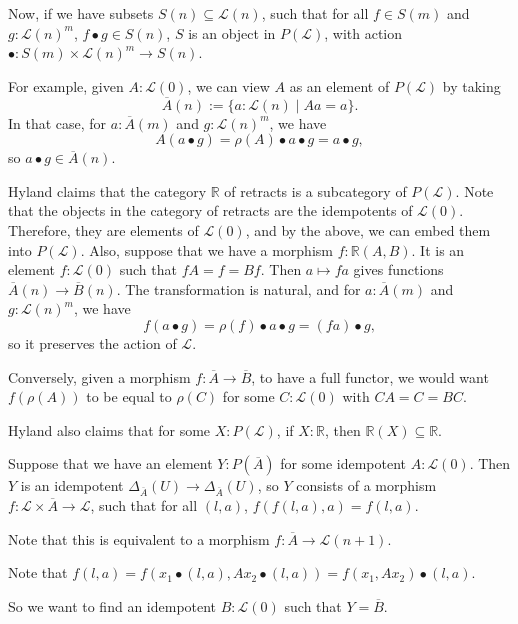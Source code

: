 \documentclass{amsbook}
\newcommand{\Hom}[3]{{#1}\left(#2,#3\right)}
\theoremstyle{definition}
\begin{document}
  Now, if we have subsets $ S(n) \subseteq \mathcal L(n) $, such that for all $ f \in S(m) $ and $ g: \mathcal L(n)^m $, $ f \bullet g \in S(n) $, $ S $ is an object in $ P(\mathcal L) $, with action $ \bullet: S(m) \times \mathcal L(n)^m \to S(n) $.

  For example, given $ A: \mathcal L(0) $, we can view $ A $ as an element of $ P(\mathcal L) $ by taking
  \[ \overline A(n) := \{ a: \mathcal L(n) \mid A a = a \}. \]
  In that case, for $ a: \overline A(m) $ and $ g: \mathcal L(n)^m $, we have
  \[ A (a \bullet g)
    = \rho(A) \bullet a \bullet g
    = a \bullet g, \]
  so $ a \bullet g \in \overline A(n) $.

  Hyland claims that the category $ \mathbb R $ of retracts is a subcategory of $ P(\mathcal L) $. Note that the objects in the category of retracts are the idempotents of $ \mathcal L(0) $. Therefore, they are elements of $ \mathcal L(0) $, and by the above, we can embed them into $ P(\mathcal L) $. Also, suppose that we have a morphism $ f: \Hom{\mathbb R}{A}{B} $. It is an element $ f: \mathcal L(0) $ such that $ f A = f = B f $. Then $ a \mapsto f a $ gives functions $ \overline A(n) \to \overline B(n) $. The transformation is natural, and for $ a: \overline A(m) $ and $ g: \mathcal L(n)^m $, we have
  \[ f (a \bullet g) = \rho(f) \bullet a \bullet g = (f a) \bullet g, \]
  so it preserves the action of $ \mathcal L $.

  Conversely, given a morphism $ f: \overline A \to \overline B $, to have a full functor, we would want $ f(\rho(A)) $ to be equal to $ \rho(C) $ for some $ C: \mathcal L(0) $ with $ CA = C = BC $.

  Hyland also claims that for some $ X: P(\mathcal L) $, if $ X: \mathbb R $, then $ \mathbb R(X) \subseteq \mathbb R $.

  Suppose that we have an element $ Y: P(\overline A) $ for some idempotent $ A: \mathcal L(0) $. Then $ Y $ is an idempotent $ \Delta_{\overline A}(U) \to \Delta_{\overline A}(U) $, so $ Y $ consists of a morphism $ f: \mathcal L \times \overline A \to \mathcal L $, such that for all $ (l, a) $, $ f(f(l, a), a) = f(l, a) $.

  Note that this is equivalent to a morphism $ f: \overline A \to \mathcal L(n + 1) $.

  Note that $ f(l, a) = f(x_1 \bullet (l, a), A x_2 \bullet (l, a)) = f(x_1, A x_2) \bullet (l, a) $.

  So we want to find an idempotent $ B: \mathcal L(0) $ such that $ Y = \overline B $.
\end{document}

